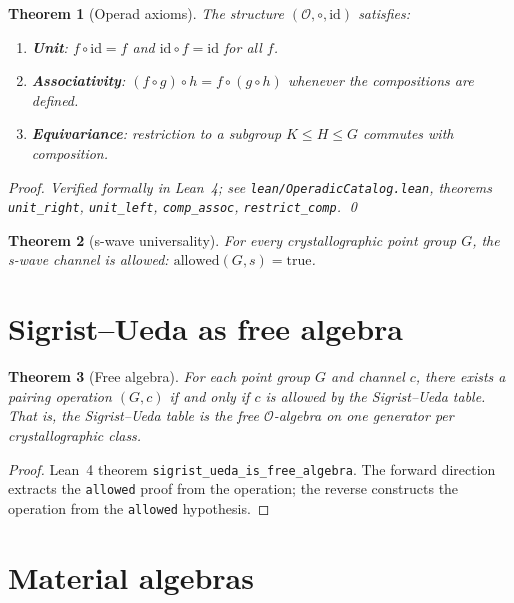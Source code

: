 \documentclass[11pt,a4paper]{article}
\newtheorem{theorem}{Theorem}[section]
\newcommand{\OO}{\mathcal{O}}
\begin{document}
\begin{theorem}[Operad axioms]\label{thm:axioms}
  The structure $(\OO, \circ, \mathrm{id})$ satisfies:
  \begin{enumerate}
    \item \textbf{Unit}: $f \circ \mathrm{id} = f$ and
          $\mathrm{id} \circ f = \mathrm{id}$ for all $f$.
    \item \textbf{Associativity}: $(f \circ g) \circ h = f \circ
          (g \circ h)$ whenever the compositions are defined.
    \item \textbf{Equivariance}: restriction to a subgroup $K \leq H
          \leq G$ commutes with composition.
  \end{enumerate}
  \emph{Proof.} Verified formally in Lean~4; see
  \texttt{lean/OperadicCatalog.lean}, theorems
  \texttt{unit\_right}, \texttt{unit\_left}, \texttt{comp\_assoc},
  \texttt{restrict\_comp}. \qed
\end{theorem}

\begin{theorem}[s-wave universality]\label{thm:swave}
  For every crystallographic point group $G$, the s-wave channel is
  allowed: $\mathrm{allowed}(G, s) = \mathrm{true}$.
\end{theorem}

\section{Sigrist--Ueda as free algebra}\label{sec:free}

\begin{theorem}[Free algebra]\label{thm:free}
  For each point group $G$ and channel $c$, there exists a pairing
  operation $(G, c)$ if and only if $c$ is allowed by the
  Sigrist--Ueda table. That is, the Sigrist--Ueda table is the free
  $\OO$-algebra on one generator per crystallographic class.
\end{theorem}

\begin{proof}
  Lean~4 theorem \texttt{sigrist\_ueda\_is\_free\_algebra}.
  The forward direction extracts the \texttt{allowed} proof from the
  operation; the reverse constructs the operation from the
  \texttt{allowed} hypothesis.
\end{proof}

\section{Material algebras}\label{sec:algebras}
\end{document}
